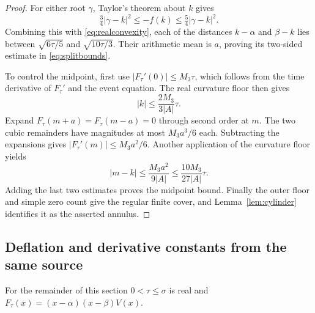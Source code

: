 \begin{proof}
For either root $\gamma$, Taylor's theorem about $k$ gives
\[
 \tfrac34|\gamma-k|^2\leq-f(k)
                       \leq\tfrac54|\gamma-k|^2.
\]
Combining this with \eqref{eq:realconvexity}, each of the distances
$k-\alpha$ and $\beta-k$ lies between $\sqrt{6\tau/5}$ and
$\sqrt{10\tau/3}$. Their arithmetic mean is $a$, proving its
two-sided estimate in \eqref{eq:splitbounds}.

To control the midpoint, first use
$|F_\tau'(0)|\leq M_3\tau$, which follows from the time derivative
of $F_\tau'$ and the event equation. The real curvature floor then
gives
\[
 |k|\leq\frac{2M_3}{3|A|}\tau.
\]
Expand $F_\tau(m+a)=F_\tau(m-a)=0$ through second order at $m$.
The two cubic remainders have magnitudes at most $M_3a^3/6$ each.
Subtracting the expansions gives $|F_\tau'(m)|\leq M_3a^2/6$.
Another application of the curvature floor yields
\[
 |m-k|\leq\frac{M_3a^2}{9|A|}
       \leq\frac{10M_3}{27|A|}\tau.
\]
Adding the last two estimates proves the midpoint bound. Finally the
outer floor and simple zero count give the regular finite cover, and
Lemma~\ref{lem:cylinder} identifies it as the asserted annulus.
\end{proof}

\subsection{Deflation and derivative constants from the same source}
For the remainder of this section $0<\tau\leq\sigma$ is real and
$F_\tau(x)=(x-\alpha)(x-\beta)V(x)$.

